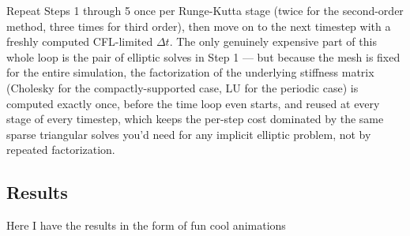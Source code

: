Repeat Steps 1 through 5 once per Runge-Kutta stage (twice for the second-order method, three times for third order), then move on to the next timestep with a freshly computed CFL-limited $\Delta t$. The only genuinely expensive part of this whole loop is the pair of elliptic solves in Step 1 — but because the mesh is fixed for the entire simulation, the factorization of the underlying stiffness matrix (Cholesky for the compactly-supported case, LU for the periodic case) is computed exactly once, before the time loop even starts, and reused at every stage of every timestep, which keeps the per-step cost dominated by the same sparse triangular solves you'd need for any implicit elliptic problem, not by repeated factorization.

\subsection{Results}

Here I have the results in the form of fun cool animations
